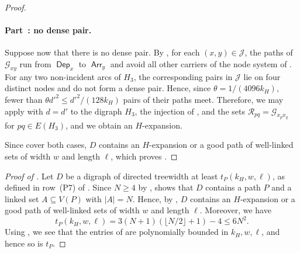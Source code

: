 \documentclass[fontsize=12pt,leading=14pt]{fullpaper}
\DeclareMathOperator{\Arr}{\mathsf{Arr}}
\DeclareMathOperator{\Dep}{\mathsf{Dep}}
\newcommand{\Gcal}{\mathcal{G}}
\newcommand{\Jcal}{\mathcal{J}}
\newcommand{\Rcal}{\mathcal{R}}
\newcounter{step}
\newcounter{proofstep}[section]
\newcommand{\proofstep}[2]{%
\paragraph*{\refstepcounter{proofstep}\label{#1}Part~\theproofstep: #2}}
\begin{document}
\begin{proof}
  \proofstep{part:core-5}{no dense pair.}
  Suppose now that there is no dense pair.
  By , for each $(x,y)\in\Jcal$, the paths of $\Gcal_{xy}$ run from $\Dep_x$ to $\Arr_y$ and avoid all other carriers of the node system of .
  For any two non-incident arcs of $H_3$, the corresponding pairs in $\Jcal$ lie on four distinct nodes and do not form a dense pair.
  Hence, since $\theta=1/(4096k_H)$, fewer than $\theta d'^2\le d'^2/(128k_H)$ pairs of their paths meet.
  Therefore, we may apply  with $d=d'$ to the digraph $H_3$, the injection of , and the sets $\Rcal_{pq}=\Gcal_{x_px_q}$ for $pq\in E(H_3)$, and we obtain an $H$-expansion.

  Since  cover both cases, $D$ contains an $H$-expansion or a good path of well-linked sets of width $w$ and length $\ell$, which proves .
\end{proof}

\begin{proof}[Proof of ]
  Let $D$ be a digraph of directed treewidth at least $t_P(k_H,w,\ell)$, as defined in row~(P7) of .
  Since $N\ge4$ by ,  shows that $D$ contains a path $P$ and a linked set $A\subseteq V(P)$ with $|A|=N$.
  Hence, by , $D$ contains an $H$-expansion or a good path of well-linked sets of width $w$ and length $\ell$.
  Moreover, we have
  \begin{equation}\label{eq:stage1-bound}
    t_P(k_H,w,\ell)=3(N+1)(\lfloor N/2\rfloor+1)-4\le6N^2.
  \end{equation}
  Using , we see that the entries of  are polynomially bounded in $k_H,w,\ell$, and hence so is $t_P$.
\end{proof}
\end{document}
